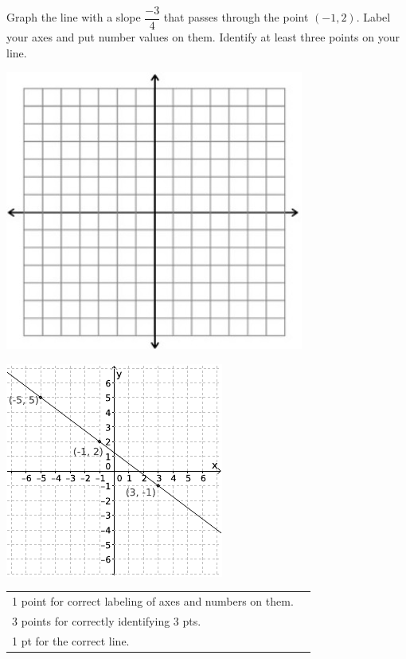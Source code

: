 {
	Graph the line with a slope $\dfrac{-3}{4}$ that passes through the point $(-1, 2)$. Label your axes and put number values on them. Identify at least three points on your line.\begin{onlyproblem}\begin{center}\includegraphics{fig-graphpaper.png}\end{center}\end{onlyproblem} \begin{onlysolution}\begin{center}\includegraphics{fig095-08-c-answer}\end{center}\end{onlysolution}
}
{
	\begin{tabular}{l r}
	1 point for correct labeling of axes and numbers on them.\\
	3 points for correctly identifying 3 pts.\\
	1 pt for the correct line.\\
	\end{tabular}
}

